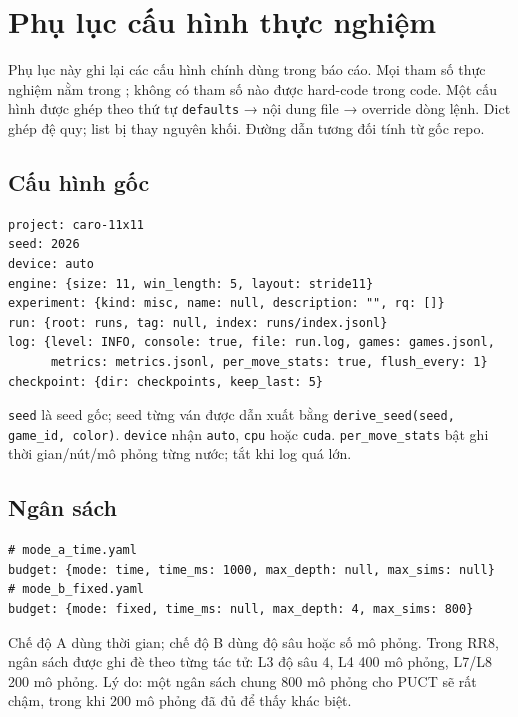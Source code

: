 \chapter{Phụ lục cấu hình thực nghiệm}
\label{app:cau-hinh}

Phụ lục này ghi lại các cấu hình chính dùng trong báo cáo. Mọi tham số thực nghiệm nằm trong
; không có tham số nào được hard-code trong code. Một cấu hình được ghép theo
thứ tự \texttt{defaults} → nội dung file → override dòng lệnh. Dict ghép đệ quy; list bị thay
nguyên khối. Đường dẫn tương đối tính từ gốc repo.

\section{Cấu hình gốc}
\begin{lstlisting}[numbers=none]
project: caro-11x11
seed: 2026
device: auto
engine: {size: 11, win_length: 5, layout: stride11}
experiment: {kind: misc, name: null, description: "", rq: []}
run: {root: runs, tag: null, index: runs/index.jsonl}
log: {level: INFO, console: true, file: run.log, games: games.jsonl,
      metrics: metrics.jsonl, per_move_stats: true, flush_every: 1}
checkpoint: {dir: checkpoints, keep_last: 5}
\end{lstlisting}
\texttt{seed} là seed gốc; seed từng ván được dẫn xuất bằng
\texttt{derive\_seed(seed, game\_id, color)}. \texttt{device} nhận \texttt{auto}, \texttt{cpu}
hoặc \texttt{cuda}. \texttt{per\_move\_stats} bật ghi thời gian/nút/mô phỏng từng nước; tắt khi
log quá lớn.

\section{Ngân sách}
\begin{lstlisting}[numbers=none]
# mode_a_time.yaml
budget: {mode: time, time_ms: 1000, max_depth: null, max_sims: null}
# mode_b_fixed.yaml
budget: {mode: fixed, time_ms: null, max_depth: 4, max_sims: 800}
\end{lstlisting}
Chế độ A dùng thời gian; chế độ B dùng độ sâu hoặc số mô phỏng. Trong RR8, ngân sách được ghi
đè theo từng tác tử: L3 độ sâu 4, L4 400 mô phỏng, L7/L8 200 mô phỏng. Lý do: một ngân sách
chung 800 mô phỏng cho PUCT sẽ rất chậm, trong khi 200 mô phỏng đã đủ để thấy khác biệt.


